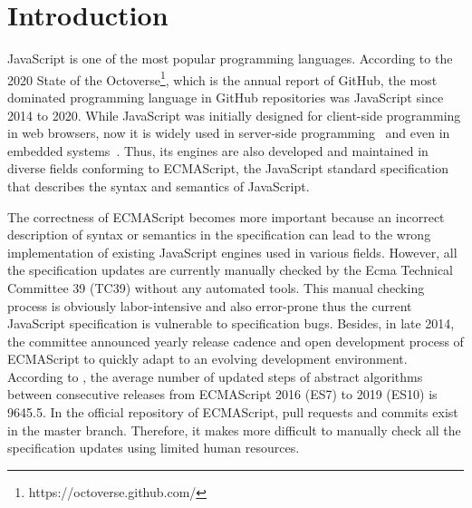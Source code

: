 \section{Introduction}\label{sec:intro}

JavaScript is one of the most popular programming languages.  According to the
2020 State of the Octoverse\footnote{https://octoverse.github.com/}, which is
the annual report of GitHub, the most dominated programming language in GitHub
repositories was JavaScript since 2014 to 2020.  While JavaScript was initially
designed for client-side programming in web browsers, now it is widely used in
server-side programming~\cite{nodejs} and even in embedded
systems~\cite{espruino, tessel2, moddable}.  Thus, its engines are also
developed and maintained in diverse fields conforming to ECMAScript, the
JavaScript standard specification that describes the syntax and semantics of
JavaScript.

The correctness of ECMAScript becomes more important because an incorrect
description of syntax or semantics in the specification can lead to the wrong
implementation of existing JavaScript engines used in various fields.  However,
all the specification updates are currently manually checked by the Ecma
Technical Committee 39 (TC39) without any automated tools.  This manual checking
process is obviously labor-intensive and also error-prone thus the current
JavaScript specification is vulnerable to specification bugs.  Besides, in late
2014, the committee announced yearly release cadence and open development
process of ECMAScript to quickly adapt to an evolving development environment.
According to \citet{jiset}, the average number of updated steps of abstract
algorithms between consecutive releases from ECMAScript 2016 (ES7) to 2019
(ES10) is 9645.5.  In the official repository of ECMAScript,  pull
requests and  commits exist in the master branch.  Therefore, it
makes more difficult to manually check all the specification updates using
limited human resources.

